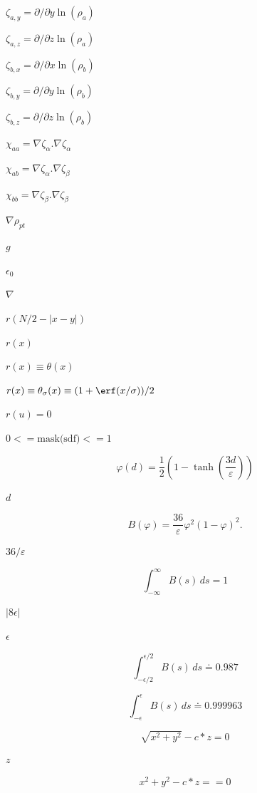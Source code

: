 \documentclass{article}
\begin{document}
$ \zeta_{a,y}=\partial/{\partial y} \ln(\rho_a)  $
\pagebreak

$ \zeta_{a,z}=\partial/{\partial z} \ln(\rho_a)  $
\pagebreak

$ \zeta_{b,x} = \partial/{\partial x} \ln(\rho_b)  $
\pagebreak

$ \zeta_{b,y} = \partial/{\partial y} \ln(\rho_b)  $
\pagebreak

$ \zeta_{b,z} = \partial/{\partial z} \ln(\rho_b)  $
\pagebreak

$ \chi_{aa} = \nabla \zeta_{\alpha}.\nabla \zeta_{\alpha} $
\pagebreak

$ \chi_{ab} = \nabla \zeta_{\alpha}.\nabla \zeta_{\beta} $
\pagebreak

$ \chi_{bb} = \nabla \zeta_{\beta}.\nabla \zeta_{\beta} $
\pagebreak

$ \nabla\rho_{pt}$
\pagebreak

$ g $
\pagebreak

$\epsilon_0$
\pagebreak

$ \nabla $
\pagebreak

$ r(N/2 - |x-y|) $
\pagebreak

$ r(x) $
\pagebreak

$ r(x) \equiv \theta(x)$
\pagebreak

$ r(x) \equiv \theta_\sigma(x) \equiv (1 + \erf(x/\sigma))/2 $
\pagebreak

$r(u) = 0$
\pagebreak

$0 <=  \mbox{mask(sdf)} <= 1$
\pagebreak

\[ \varphi(d) = \frac{1}{2}\left( 1 - \tanh\left(
                 \frac{3d}{\varepsilon} \right) \right) \]
\pagebreak

$d$
\pagebreak

\[ B(\varphi) = \frac{36}{\varepsilon} \varphi^2 (1-\varphi)^2. \]
\pagebreak

$36/\varepsilon$
\pagebreak

\[ \int_{-\infty}^\infty B(s) \, ds = 1 \]
\pagebreak

$ |8 \epsilon| $
\pagebreak

$ \epsilon $
\pagebreak

\[ \int_{-\epsilon/2}^{\epsilon/2} B(s) \, ds \doteq 0.987 \]
\pagebreak

\[ \int_{-\epsilon}^{\epsilon} B(s) \, ds \doteq 0.999963 \]
\pagebreak

\[ \sqrt{x^2 + y^2} - c * z = 0 \]
\pagebreak

$ z $
\pagebreak

\[ x^2 + y^2 - c * z == 0 \]
\pagebreak
\end{document}
